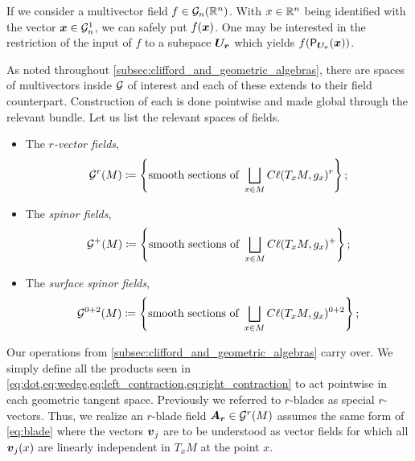 \begin{remark}
\label{rem:input_projection}
    If we consider a multivector field $f \in \mathcal{G}_n(\mathbb{R}^n)$. With $x\in \mathbb{R}^n$ being identified with the vector $\boldsymbol{x} \in \mathcal{G}_n^1$, we can safely put $f(\boldsymbol{x})$.  One may be interested in the restriction of the input of $f$ to a subspace $\boldsymbol{U_r}$ which yields $f(\mathsf{P}_{\boldsymbol{U_r}}(\boldsymbol{x}))$.  
\end{remark}

As noted throughout \cref{subsec:clifford_and_geometric_algebras}, there are spaces of multivectors inside $\mathcal{G}$ of interest and each of these extends to their field counterpart. Construction of each is done pointwise and made global through the relevant bundle. Let us list the relevant spaces of fields.
\begin{itemize}
    \item The \emph{$r$-vector fields},
    \begin{equation}
        \mathcal{G}^r(M) \coloneqq \left\{\textrm{smooth sections of } \bigsqcup_{x \in M} C\ell(T_xM,g_x)^r\right\}; 
    \end{equation}
    \item The \emph{spinor fields},
    \begin{equation}
        \mathcal{G}^+(M) \coloneqq \left\{\textrm{smooth sections of } \bigsqcup_{x \in M} C\ell(T_xM,g_x)^+\right\};
    \end{equation}
    \item The \emph{surface spinor fields},
    \begin{equation}
        \mathcal{G}^{0+2}(M) \coloneqq \left\{\textrm{smooth sections of } \bigsqcup_{x \in M}  C\ell(T_xM,g_x)^{0+2}\right\};
    \end{equation}
\end{itemize}
Our operations from \cref{subsec:clifford_and_geometric_algebras} carry over. We simply define all the products seen in \cref{eq:dot,eq:wedge,eq:left_contraction,eq:right_contraction} to act pointwise in each geometric tangent space. Previously we referred to $r$-blades as special $r$-vectors. Thus, we realize an $r$-blade field $\boldsymbol{A_r} \in \mathcal{G}^r(M)$ assumes the same form of \cref{eq:blade} where the vectors $\boldsymbol{v}_j$ are to be understood as vector fields for which all $\boldsymbol{v}_j(x)$ are linearly independent in $T_xM$ at the point $x$.

